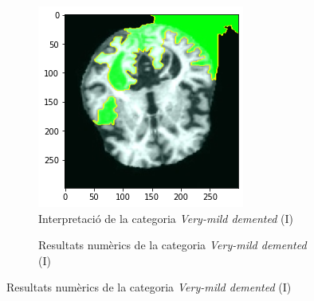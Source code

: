 \documentclass[a4paper,12pt]{article}
\begin{document}
\begin{figure}[h!]
    \centering
    \begin{subfigure}[b]{0.40\linewidth}
        \includegraphics[width=\linewidth]{images/Very mildly.png}
        \caption{Interpretació de la categoria \textit{Very-mild demented} (I)}
        \label{fig:VMD1}
    \end{subfigure}
    \begin{subfigure}[b]{0.40\linewidth}
        \caption{Resultats numèrics de la categoria \textit{Very-mild demented} (I)}
        \label{fig:ClassificacioVMD1}
    \end{subfigure}

\end{figure}
\end{document}
